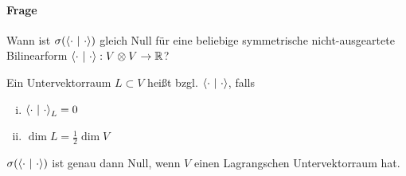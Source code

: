 \paragraph{Frage}
Wann ist $\sigma(\left<\cdot ~|~\cdot\right>)$ gleich Null für eine beliebige symmetrische nicht-ausgeartete Bilinearform $\left<\cdot~|~\cdot\right> : V\otimes V \overset{}{\rightarrow} \mathbb{R}$?

\Def{}
Ein Untervektorraum $L\subset V$ heißt  bzgl. $\left<\cdot ~|~\cdot\right>$, falls
\begin{enumerate}[i.)]
	\item $\left<\cdot ~|~\cdot\right>_{L} = 0$
	\item $\dim L = \frac{1}{2} \dim V$
\end{enumerate}

\Satz{}
$\sigma(\left<\cdot ~|~\cdot\right>)$ ist genau dann Null, wenn $V$ einen Lagrangschen Untervektorraum hat.
